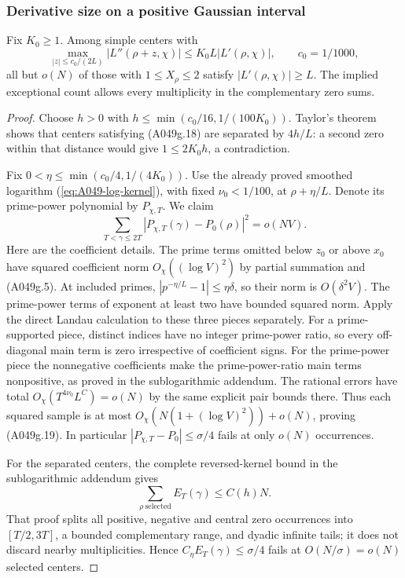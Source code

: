 \subsubsection*{Derivative size on a positive Gaussian interval}

\begin{lemma}
\label{lem:A049-positive-prime-derivative}
Fix $K_0\ge1$. Among simple centers with
\[
 \max_{|z|\le c_0/(2L)}|L''(\rho+z,\chi)|
            \le K_0L|L'(\rho,\chi)|,\qquad c_0=1/1000,
\tag{A049g.18}
\]
all but $o(N)$ of those with $1\le X_\rho\le2$ satisfy
$|L'(\rho,\chi)|\ge L$. The implied exceptional count
allows every multiplicity in the complementary zero sums.
\end{lemma}

\begin{proof}
Choose $h>0$ with $h\le\min(c_0/16,1/(100K_0))$.
Taylor's theorem shows that centers satisfying (A049g.18)
are separated by $4h/L$: a second zero within that distance
would give $1\le2K_0h$, a contradiction.

Fix $0<\eta\le\min(c_0/4,1/(4K_0))$. Use the already
proved smoothed logarithm (\ref{eq:A049-log-kernel}), with
fixed $\nu_0<1/100$, at $\rho+\eta/L$. Denote its prime-power
polynomial by $P_{\chi,T}$. We claim
\[
 \sum_{T<\gamma\le2T}
       |P_{\chi,T}(\gamma)-P_0(\rho)|^2=o(NV).
\tag{A049g.19}
\]
Here are the coefficient details. The prime terms omitted below
$z_0$ or above $x_0$ have squared coefficient norm
$O_\chi((\log V)^2)$ by partial summation and (A049g.5).
At included primes, $|p^{-\eta/L}-1|\le\eta\delta$, so
their norm is $O(\delta^2V)$. The prime-power terms of
exponent at least two have bounded squared norm. Apply the
direct Landau calculation to these three pieces separately.
For a prime-supported piece, distinct indices have no
integer prime-power ratio, so every off-diagonal main term
is zero irrespective of coefficient signs. For the
prime-power piece the nonnegative coefficients make the
prime-power-ratio main terms nonpositive, as proved in the
sublogarithmic addendum. The rational errors have total
$O_\chi(T^{4\nu_0}L^C)=o(N)$ by the same explicit
pair bounds there. Thus each squared sample is at most
$O_\chi(N(1+(\log V)^2))+o(N)$, proving (A049g.19).
In particular $|P_{\chi,T}-P_0|\le\sigma/4$ fails at
only $o(N)$ occurrences.

For the separated centers, the complete reversed-kernel
bound in the sublogarithmic addendum gives
\[
 \sum_{\rho\ \mathrm{selected}}E_T(\gamma)\le C(h)N.
\]
That proof splits all positive, negative and central zero
occurrences into $[T/2,3T]$, a bounded complementary range,
and dyadic infinite tails; it does not discard nearby
multiplicities. Hence $C_\eta E_T(\gamma)\le\sigma/4$
fails at $O(N/\sigma)=o(N)$ selected centers.


\end{proof}
